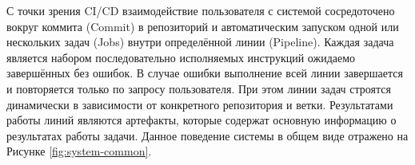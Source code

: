 С точки зрения CI/CD взаимодействие пользователя с системой сосредоточено вокруг коммита (Commit) в репозиторий и
автоматическим запуском одной или нескольких задач (Jobs) внутри определённой линии (Pipeline)\cite{cd}.
Каждая задача является набором последовательно исполняемых инструкций ожидаемо завершённых без ошибок.
В случае ошибки выполнение всей линии завершается и повторяется только по запросу пользователя.
При этом линии задач строятся динамически в зависимости от конкретного репозитория и ветки.
Результатами работы линий являются артефакты, которые содержат основную информацию о результатах работы задачи.
Данное поведение системы в общем виде отражено на Рисунке \ref{fig:system-common}.

\begin{figure}[h!]
    \centering
\end{figure}
